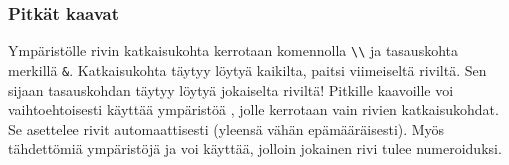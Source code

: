 \begin{frame}[fragile]
    \frametitle{Pitkät kaavat}
    Ympäristölle  rivin katkaisukohta kerrotaan komennolla \lstinline-\\- ja tasauskohta merkillä \lstinline-&-. Katkaisukohta täytyy löytyä kaikilta, paitsi viimeiseltä riviltä. Sen sijaan tasauskohdan täytyy löytyä jokaiselta riviltä!
    \vaihto
    Pitkille kaavoille voi vaihtoehtoisesti käyttää ympäristöä , jolle kerrotaan vain rivien katkaisukohdat. Se asettelee rivit automaattisesti (yleensä vähän epämääräisesti).
    \vaihto
    Myös tähdettömiä ympäristöjä  ja  voi käyttää, jolloin jokainen rivi tulee numeroiduksi.
\end{frame}

